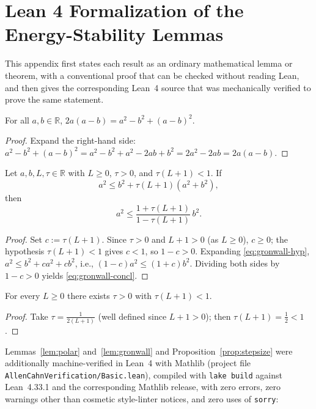 \appendixstart
\appendix
\section{Lean 4 Formalization of the Energy-Stability Lemmas}\label{app:lean}

This appendix first states each result as an ordinary mathematical lemma or theorem, with a conventional proof that can be checked without reading Lean, and then gives the corresponding Lean~4 source that was mechanically verified to prove the same statement.

\begin{Lemma}\label{lem:polar}
For all $a,b\in\mathbb{R}$, $2a(a-b) = a^2-b^2+(a-b)^2$.
\end{Lemma}
\begin{proof}
Expand the right-hand side: $a^2-b^2+(a-b)^2 = a^2-b^2+a^2-2ab+b^2 = 2a^2-2ab = 2a(a-b)$.
\end{proof}

\begin{Lemma}\label{lem:gronwall}
Let $a,b,L,\tau\in\mathbb{R}$ with $L\ge0$, $\tau>0$, and $\tau(L+1)<1$. If
\begin{equation}\label{eq:gronwall-hyp}
a^2 \le b^2+\tau(L+1)(a^2+b^2),
\end{equation}
then
\begin{equation}\label{eq:gronwall-concl}
a^2 \le \frac{1+\tau(L+1)}{1-\tau(L+1)}\,b^2.
\end{equation}
\end{Lemma}
\begin{proof}
Set $c:=\tau(L+1)$. Since $\tau>0$ and $L+1>0$ (as $L\ge0$), $c\ge0$; the hypothesis $\tau(L+1)<1$ gives $c<1$, so $1-c>0$. Expanding \eqref{eq:gronwall-hyp}, $a^2\le b^2+ca^2+cb^2$, i.e., $(1-c)a^2\le(1+c)b^2$. Dividing both sides by $1-c>0$ yields \eqref{eq:gronwall-concl}.
\end{proof}

\begin{Proposition}\label{prop:stepsize}
For every $L\ge0$ there exists $\tau>0$ with $\tau(L+1)<1$.
\end{Proposition}
\begin{proof}
Take $\tau=\frac{1}{2(L+1)}$ (well defined since $L+1>0$); then $\tau(L+1)=\tfrac12<1$.
\end{proof}

Lemmas~\ref{lem:polar} and~\ref{lem:gronwall} and Proposition~\ref{prop:stepsize} were additionally machine-verified in Lean~4 with Mathlib (project file \texttt{AllenCahnVerification/Basic.lean}), compiled with \texttt{lake build} against Lean~4.33.1 and the corresponding Mathlib release, with zero errors, zero warnings other than cosmetic style-linter notices, and zero uses of \texttt{sorry}:

